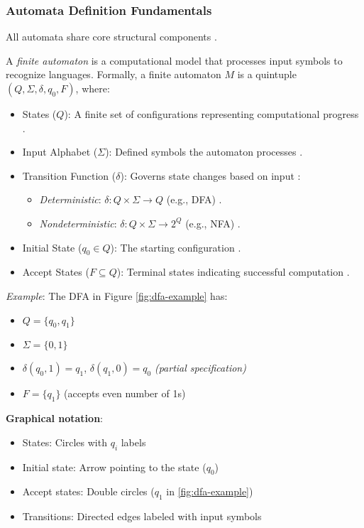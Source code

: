 \subsubsection{Automata Definition Fundamentals}  
All automata share core structural components \cite{hopcroft2006introduction, chomsky1956three}.  

\begin{definition}
    \label{def:finite-automaton}
    A \textit{finite automaton} is a computational model that processes input symbols to recognize languages. Formally, a finite automaton $M$ is a quintuple $(Q, \Sigma, \delta, q_0, F)$, where:
    \begin{itemize}
        \item {States ($Q$)}: A finite set of configurations representing computational progress \cite{hopcroft2006introduction}. 
        \item {Input Alphabet ($\Sigma$)}: Defined symbols the automaton processes \cite{hopcroft2006introduction}.
        \item {Transition Function ($\delta$)}: Governs state changes based on input \cite{chomsky1956three}:  
        \begin{itemize}
            \item \textit{Deterministic}: $\delta: Q \times \Sigma \to Q$ (e.g., DFA) \cite{hopcroft2006introduction}.  
            \item \textit{Nondeterministic}: $\delta: Q \times \Sigma \to 2^Q$ (e.g., NFA) \cite{rabin1963probabilistic}.  
        \end{itemize}
        \item {Initial State ($q_0 \in Q$)}: The starting configuration \cite{hopcroft2006introduction}. 
        \item {Accept States ($F \subseteq Q$)}: Terminal states indicating successful computation \cite{hopcroft2006introduction}.
    \end{itemize} 
\end{definition}

\noindent\textit{Example}: The DFA in Figure \ref{fig:dfa-example} has:  
\begin{itemize}
    \item $Q = \{q_0, q_1\}$  
    \item $\Sigma = \{0, 1\}$  
    \item $\delta(q_0, 1) = q_1$, $\delta(q_1, 0) = q_0$ \textit{(partial specification)}  
    \item $F = \{q_1\}$ (accepts even number of 1s)  
\end{itemize}
\noindent\textbf{Graphical notation}: 
\begin{itemize}
    \item States: Circles with $q_i$ labels  
        \item Initial state: Arrow pointing to the state ($q_0$)  
        \item Accept states: Double circles ($q_1$ in \ref{fig:dfa-example})  
        \item Transitions: Directed edges labeled with input symbols  
\end{itemize}



